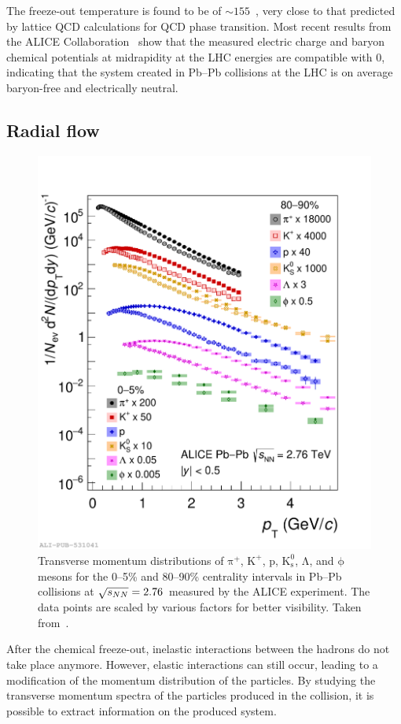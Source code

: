 The freeze-out temperature is found to be of $\sim 155$~\mev, very close to that predicted by lattice QCD calculations for QCD phase transition. Most recent results from the ALICE Collaboration~\cite{ALICE:2023ulv} show that the measured electric charge and baryon chemical potentials at midrapidity at the LHC energies are compatible with 0, indicating that the system created in Pb--Pb collisions at the LHC is on average baryon-free and electrically neutral.

\subsection{Radial flow}
\begin{figure}[t]
  \centering
  \includegraphics[width=0.7\linewidth]{Figures/Chapter 1/spectra_run1.pdf}
  \caption{Transverse momentum distributions of $\mathrm{\pi^+}$, $\mathrm{K^+}$, p, $\mathrm{K^0_s}$, $\mathrm{\Lambda}$, and $\mathrm{\phi}$ mesons for the 0--5\% and 80--90\% centrality intervals in Pb--Pb collisions at $\sqrt{s_{NN}}=2.76$~\tev measured by the ALICE experiment. The data points are scaled by various factors for better visibility. Taken from~\cite{ALICE:2022wpn}.}
  \label{fig:RadialFlow}
\end{figure}
After the chemical freeze-out, inelastic interactions between the hadrons do not take place anymore. However, elastic interactions can still occur, leading to a modification of the momentum distribution of the particles. By studying the transverse momentum spectra of the particles produced in the collision, it is possible to extract information on the produced system.

